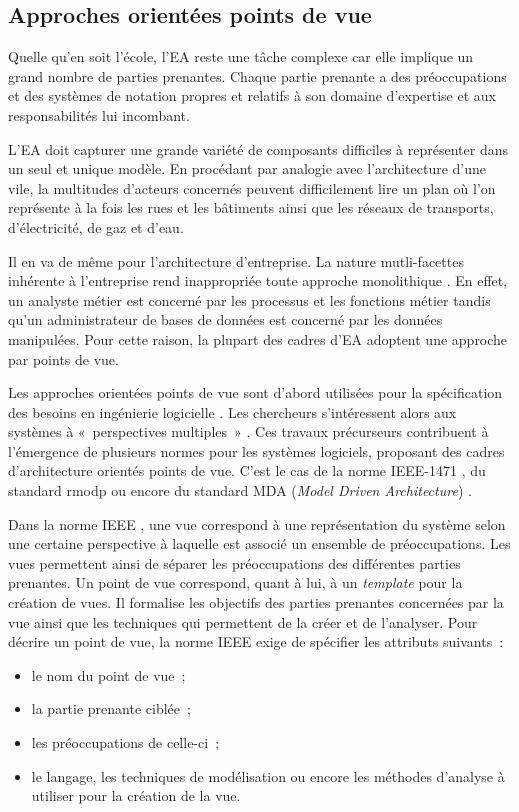 \subsection{Approches orientées points de vue}

Quelle qu'en soit l'école, l'EA reste une tâche complexe
\cite{steen2004supporting} car elle implique un grand nombre de parties
prenantes. Chaque partie prenante a des préoccupations et des systèmes de
notation propres et relatifs à son domaine d'expertise et aux responsabilités lui
incombant.

L'EA doit capturer une grande variété de composants difficiles à représenter
dans un seul et unique modèle. En procédant par analogie avec l'architecture
d'une vile, la multitudes d'acteurs concernés peuvent difficilement lire un plan où l'on
représente à la fois les rues et les bâtiments ainsi que les réseaux de
transports, d'électricité, de gaz et d'eau. 

Il en va de même pour l'architecture d'entreprise. La nature mutli-facettes
inhérente à l'entreprise rend inappropriée toute approche monolithique
\cite{armour1999bigpicture}. En effet, un analyste métier est concerné par les
processus et les fonctions métier tandis qu'un administrateur de bases de
données est concerné par les données manipulées. Pour cette raison, la plupart des
cadres d'EA adoptent une approche par points de vue.

Les approches orientées points de vue sont d'abord utilisées pour la
spécification des besoins en ingénierie logicielle \cite{mullery1979core}. Les
chercheurs s'intéressent alors aux systèmes à «~perspectives multiples~»
\cite{finkelstein1992viewpoints} \cite{kotonya1996requirements}
\cite{nuseibeh1994multi} \cite{meyers1993representing}. Ces travaux précurseurs
contribuent à l'émergence de plusieurs normes pour les systèmes logiciels,
proposant des cadres d'architecture orientés points de vue. C'est le cas de la
norme IEEE-1471 \cite{hilliard2000ieee}, du standard \gls{rmodp}
\cite{raymond1995reference} ou encore du standard MDA (\textit{Model Driven
Architecture}) \cite{kleppe2003mda}.

Dans la norme IEEE \cite{hilliard2000ieee}, une vue correspond à une
représentation du système selon une certaine perspective à laquelle est
associé un ensemble de préoccupations. Les vues permettent ainsi de séparer
les préoccupations des différentes parties prenantes. Un point de vue
correspond, quant à lui, à un \textit{template} pour la création de vues. Il formalise
les objectifs des parties prenantes concernées par la vue ainsi que les
techniques qui permettent de la créer et de l'analyser. Pour décrire un point
de vue, la norme IEEE \cite{hilliard2000ieee} exige de spécifier les
attributs suivants~:
\begin{itemize} 
	\item le nom du point de vue~;
	\item la partie prenante ciblée~;
	\item les préoccupations de celle-ci~;
	\item le langage, les techniques de modélisation ou encore les méthodes d'analyse à utiliser pour
la création de la vue. 
\end{itemize}

